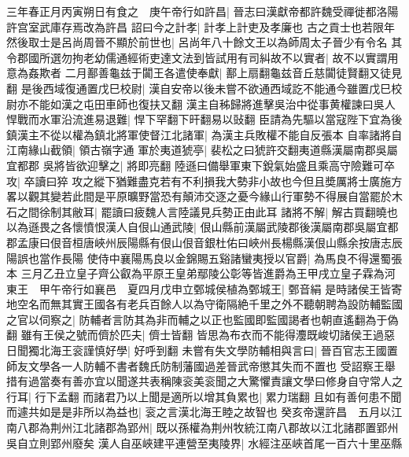 三年春正月丙寅朔日有食之　庚午帝行如許昌|{
	晉志曰漢獻帝都許魏受禪徙都洛陽許宫室武庫存焉改為許昌}
詔曰今之計孝|{
	計孝上計吏及孝廉也}
古之貢士也若限年然後取士是呂尚周晉不顯於前世也|{
	呂尚年八十餘文王以為師周太子晉少有令名}
其令郡國所選勿拘老幼儒通經術吏達文法到皆試用有司糾故不以實者|{
	故不以實謂用意為姦欺者}
二月鄯善龜兹于闐王各遣使奉獻|{
	鄯上扇翻龜兹音丘慈闐徒賢翻又徒見翻}
是後西域復通置戊巳校尉|{
	漢自安帝以後未嘗不欲通西域訖不能通今雖置戊巳校尉亦不能如漢之屯田車師也復扶又翻}
漢主自秭歸將進擊吳治中從事黄權諫曰吳人悍戰而水軍沿流進易退難|{
	悍下罕翻下旰翻易以䜴翻}
臣請為先驅以當寇陛下宜為後鎮漢主不從以權為鎮北將軍使督江北諸軍|{
	為漢主兵敗權不能自反張本}
自率諸將自江南緣山截領|{
	領古嶺字通}
軍於夷道猇亭|{
	裴松之曰猇許交翻夷道縣漢屬南郡吳屬宜都郡}
吳將皆欲迎擊之|{
	將即亮翻}
陸遜曰備舉軍東下銳氣始盛且乘高守險難可卒攻|{
	卒讀曰猝}
攻之縱下猶難盡克若有不利損我大勢非小故也今但且奬厲將士廣施方畧以觀其變若此間是平原曠野當恐有顛沛交逐之憂今緣山行軍勢不得展自當罷於木石之間徐制其敝耳|{
	罷讀曰疲魏人言陸議見兵勢正由此耳}
諸將不解|{
	解古買翻曉也}
以為遜畏之各懷憤恨漢人自佷山通武陵|{
	佷山縣前漢屬武陵郡後漢屬南郡吳屬宜都郡孟康曰佷音桓唐峽州辰陽縣有佷山佷音銀杜佑曰峽州長楊縣漢佷山縣余按唐志辰陽誤也當作長陽}
使侍中襄陽馬良以金錦賜五谿諸蠻夷授以官爵|{
	為馬良不得還蜀張本}
三月乙丑立皇子齊公叡為平原王皇弟鄢陵公彰等皆進爵為王甲戌立皇子霖為河東王　甲午帝行如襄邑　夏四月戊申立鄄城侯植為鄄城王|{
	鄄音絹}
是時諸侯王皆寄地空名而無其實王國各有老兵百餘人以為守衛隔絶千里之外不聽朝聘為設防輔監國之官以伺察之|{
	防輔者言防其為非而輔之以正也監國即監國謁者也朝直遙翻為于偽翻}
雖有王侯之號而儕於匹夫|{
	儕士皆翻}
皆思為布衣而不能得灋既峻切諸侯王過惡日聞獨北海王衮謹慎好學|{
	好呼到翻}
未嘗有失文學防輔相與言曰|{
	晉百官志王國置師友文學各一人防輔不書者魏氏防制藩國過差晉武帝懲其失而不置也}
受詔察王舉措有過當奏有善亦宜以聞遂共表稱陳衮美衮聞之大驚懼責讓文學曰修身自守常人之行耳|{
	行下孟翻}
而諸君乃以上聞是適所以增其負累也|{
	累力瑞翻}
且如有善何患不聞而遽共如是是非所以為益也|{
	衮之言漢北海王睦之故智也}
癸亥帝還許昌　五月以江南八郡為荆州江北諸郡為郢州|{
	既以孫權為荆州牧統江南八郡故以江北諸郡置郢州吳自立則郢州廢矣}
漢人自巫峽建平連營至夷陵界|{
	水經注巫峽首尾一百六十里巫縣}


